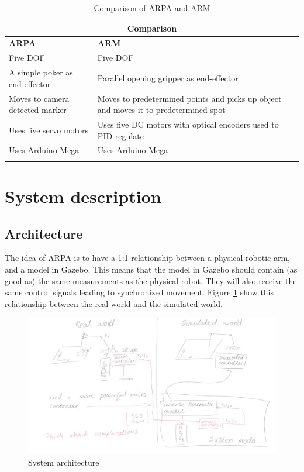 \documentclass[11pt,a4paper, titlepage]{article}
\begin{document}
\begin{center}           
    \begin{longtable}{| p{8cm} | p{8cm} |}
              \hline
                       
\multicolumn{2}{|c|}{\textbf{Comparison}} \\ \hline \endhead
\textbf{ARPA} & \textbf{ARM}  \\ \hline             
                Five DOF & Five DOF  \\ \hline
                A simple poker as end-effector & Parallel opening gripper as end-effector  \\ \hline
               Moves to camera detected marker & Moves to predetermined points and picks up object and moves it to predetermined spot  \\ \hline
                Uses five servo motors  & Uses five DC motors with optical encoders used to PID regulate  \\ \hline
                Uses Arduino Mega & Uses Arduino Mega   \\ \hline
               
\caption{Comparison of ARPA and ARM}
\label{comp-table2}                                       
\end{longtable}
\end{center}






\section{System description}
\label{description}
	

\subsection{Architecture}
The idea of ARPA is to have a 1:1 relationship between a physical robotic arm, and a model in Gazebo. This means that the model in Gazebo should contain (as good as) the same measurements as the physical robot. They will also receive the same control signals leading to synchronized movement. Figure \ref{fig:architecture} show this relationship between the real world and the simulated world.
	
	\begin{figure}[H]
		\includegraphics[width=\linewidth]{../Diagrams/Architecture.png}
		\caption{System architecture}
		\label{fig:architecture}
	\end{figure}
	
\end{document}
